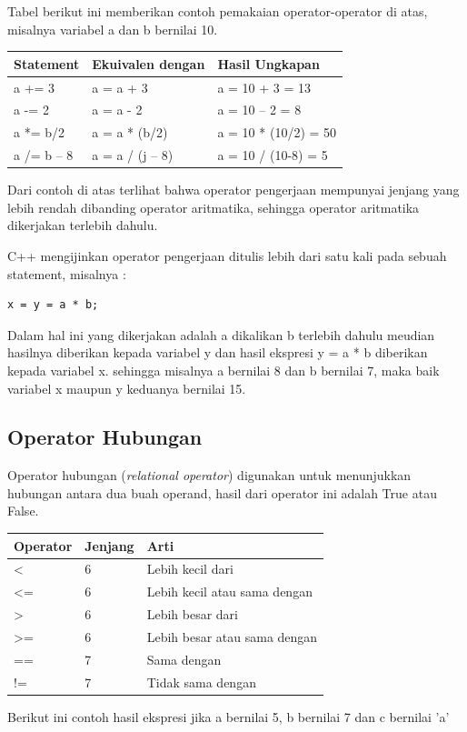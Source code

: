 Tabel berikut ini memberikan contoh pemakaian operator-operator di atas,
misalnya variabel a dan b bernilai 10.

\begin{longtable}[]{@{}lll@{}}
\toprule
Statement & Ekuivalen dengan & Hasil Ungkapan\tabularnewline
\midrule
\endhead
a += 3 & a = a + 3 & a = 10 + 3 = 13\tabularnewline
a -= 2 & a = a - 2 & a = 10 -- 2 = 8\tabularnewline
a *= b/2 & a = a * (b/2) & a = 10 * (10/2) = 50\tabularnewline
a /= b -- 8 & a = a / (j -- 8) & a = 10 / (10-8) = 5\tabularnewline
\bottomrule
\end{longtable}

Dari contoh di atas terlihat bahwa operator pengerjaan mempunyai jenjang
yang lebih rendah dibanding operator aritmatika, sehingga operator
aritmatika dikerjakan terlebih dahulu.

C++ mengijinkan operator pengerjaan ditulis lebih dari satu kali pada
sebuah statement, misalnya :

\begin{verbatim}
x = y = a * b;
\end{verbatim}

Dalam hal ini yang dikerjakan adalah a dikalikan b terlebih dahulu
meudian hasilnya diberikan kepada variabel y dan hasil ekspresi y = a *
b diberikan kepada variabel x. sehingga misalnya a bernilai 8 dan b
bernilai 7, maka baik variabel x maupun y keduanya bernilai 15.

\subsection{Operator Hubungan}\label{e-operator-hubungan}

Operator hubungan (\emph{relational operator}) digunakan untuk
menunjukkan hubungan antara dua buah operand, hasil dari operator ini
adalah True atau False.

\begin{longtable}[]{@{}lll@{}}
\toprule
Operator & Jenjang & Arti\tabularnewline
\midrule
\endhead
\textless{} & 6 & Lebih kecil dari\tabularnewline
\textless{}= & 6 & Lebih kecil atau sama dengan\tabularnewline
\textgreater{} & 6 & Lebih besar dari\tabularnewline
\textgreater{}= & 6 & Lebih besar atau sama dengan\tabularnewline
== & 7 & Sama dengan\tabularnewline
!= & 7 & Tidak sama dengan\tabularnewline
\bottomrule
\end{longtable}

Berikut ini contoh hasil ekspresi jika a bernilai 5, b bernilai 7 dan c
bernilai 'a'

